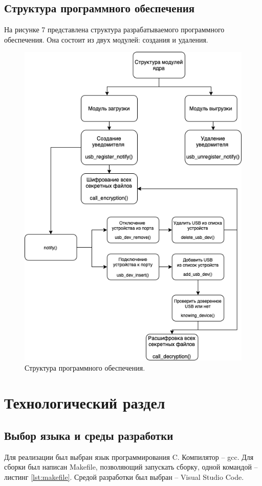 \documentclass[a4paper, 10pt]{article}
\begin{document}
	\subsection{Структура программного обеспечения}
	На рисунке 7 представлена структура разрабатываемого программного обеспечения. Она состоит из двух модулей: создания и удаления.
	\begin{figure}[h!]
		\centering
		\includegraphics[scale=0.6]{po}
		\centering\caption{Структура программного обеспечения.}
	\end{figure}
\clearpage
\newpage
\section{Технологический раздел}
	\subsection{Выбор языка и среды разработки}
	\hspace*{5mm}Для реализации был выбран язык программирования C. Компилятор -- gcc. Для сборки был написан Makefile, позволяющий запускать сборку, одной командой -- листинг \ref{lst:makefile}. Средой разработки был выбран -- Visual Studio Code.  
\end{document}
